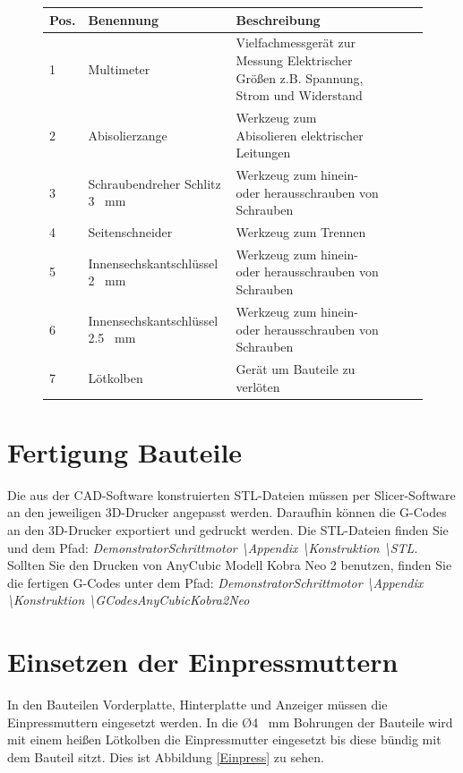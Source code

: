 \begin{figure}[H]
	\begin{center}
		\fontsize{8}{10}\selectfont
		\begin{tabularx}{\textwidth}{|p{0.4cm}|p{3.4cm}|X|X|X|X|} 
			\hline 
			\textbf{Pos.} &  \textbf{Benennung} &  \textbf{Beschreibung}\\ \hline
			1 & Multimeter & Vielfachmessgerät zur Messung Elektrischer Größen z.B. Spannung, Strom und Widerstand  \\ \hline
			2 & Abisolierzange & Werkzeug zum Abisolieren elektrischer Leitungen  \\ \hline
			3 & Schraubendreher Schlitz 3 \ mm & Werkzeug zum hinein- oder herausschrauben von Schrauben \\ \hline
			4 & Seitenschneider & Werkzeug zum Trennen  \\ \hline
			5 & Innensechskantschlüssel 2 \ mm &  Werkzeug zum hinein- oder herausschrauben von Schrauben \\ \hline
			6 & Innensechskantschlüssel 2.5 \ mm &  Werkzeug zum hinein- oder herausschrauben von Schrauben \\ \hline
			7 & Lötkolben &  Gerät um Bauteile zu verlöten \\ \hline

		\end{tabularx}
			\label{WerkTab}
	\end{center}
\end{figure}

\section{Fertigung Bauteile}
Die aus der CAD-Software konstruierten STL-Dateien müssen per Slicer-Software an den jeweiligen 3D-Drucker angepasst werden. Daraufhin können die G-Codes an den 3D-Drucker exportiert und gedruckt werden. Die STL-Dateien finden Sie und dem Pfad: \emph{DemonstratorSchrittmotor \textbackslash Appendix \textbackslash Konstruktion \textbackslash STL}. Sollten Sie den Drucken von AnyCubic Modell Kobra Neo 2 benutzen, finden Sie die fertigen G-Codes unter dem Pfad: \emph{DemonstratorSchrittmotor \textbackslash Appendix \textbackslash Konstruktion \textbackslash GCodesAnyCubicKobra2Neo}
\section{Einsetzen der Einpressmuttern}
In den Bauteilen Vorderplatte, Hinterplatte und Anzeiger müssen die Einpressmuttern eingesetzt werden. In die \O 4 \ mm Bohrungen der Bauteile wird mit einem heißen Lötkolben die Einpressmutter eingesetzt bis diese bündig mit dem Bauteil sitzt. Dies ist Abbildung \ref{Einpress} zu sehen.

